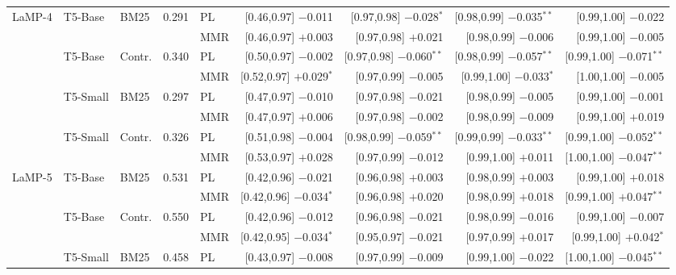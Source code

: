 \documentclass[10pt,twocolumn]{article}
\begin{document}
\begin{table}[t]
\begin{tabular}{@{}lllrlrrrr@{}}
\midrule
\multirow{2}{*}{LaMP-4} & \multirow{2}{*}{T5-Base} & \multirow{2}{*}{BM25} & \multirow{2}{*}{0.291} & PL & [0.46,0.97] $-$0.011 & [0.97,0.98] $-$0.028$^{*}$ & [0.98,0.99] $-$0.035$^{**}$ & [0.99,1.00] $-$0.022 \\
 & & & & MMR & [0.46,0.97] $+$0.003 & [0.97,0.98] $+$0.021 & [0.98,0.99] $-$0.006 & [0.99,1.00] $-$0.005 \\
\cmidrule(lr){1-9}
 & \multirow{2}{*}{T5-Base} & \multirow{2}{*}{Contr.} & \multirow{2}{*}{0.340} & PL & [0.50,0.97] $-$0.002 & [0.97,0.98] $-$0.060$^{**}$ & [0.98,0.99] $-$0.057$^{**}$ & [0.99,1.00] $-$0.071$^{**}$ \\
 & & & & MMR & [0.52,0.97] $+$0.029$^{*}$ & [0.97,0.99] $-$0.005 & [0.99,1.00] $-$0.033$^{*}$ & [1.00,1.00] $-$0.005 \\
\cmidrule(lr){1-9}
 & \multirow{2}{*}{T5-Small} & \multirow{2}{*}{BM25} & \multirow{2}{*}{0.297} & PL & [0.47,0.97] $-$0.010 & [0.97,0.98] $-$0.021 & [0.98,0.99] $-$0.005 & [0.99,1.00] $-$0.001 \\
 & & & & MMR & [0.47,0.97] $+$0.006 & [0.97,0.98] $-$0.002 & [0.98,0.99] $-$0.009 & [0.99,1.00] $+$0.019 \\
\cmidrule(lr){1-9}
 & \multirow{2}{*}{T5-Small} & \multirow{2}{*}{Contr.} & \multirow{2}{*}{0.326} & PL & [0.51,0.98] $-$0.004 & [0.98,0.99] $-$0.059$^{**}$ & [0.99,0.99] $-$0.033$^{**}$ & [0.99,1.00] $-$0.052$^{**}$ \\
 & & & & MMR & [0.53,0.97] $+$0.028 & [0.97,0.99] $-$0.012 & [0.99,1.00] $+$0.011 & [1.00,1.00] $-$0.047$^{**}$ \\
\midrule
\multirow{2}{*}{LaMP-5} & \multirow{2}{*}{T5-Base} & \multirow{2}{*}{BM25} & \multirow{2}{*}{0.531} & PL & [0.42,0.96] $-$0.021 & [0.96,0.98] $+$0.003 & [0.98,0.99] $+$0.003 & [0.99,1.00] $+$0.018 \\
 & & & & MMR & [0.42,0.96] $-$0.034$^{*}$ & [0.96,0.98] $+$0.020 & [0.98,0.99] $+$0.018 & [0.99,1.00] $+$0.047$^{**}$ \\
\cmidrule(lr){1-9}
 & \multirow{2}{*}{T5-Base} & \multirow{2}{*}{Contr.} & \multirow{2}{*}{0.550} & PL & [0.42,0.96] $-$0.012 & [0.96,0.98] $-$0.021 & [0.98,0.99] $-$0.016 & [0.99,1.00] $-$0.007 \\
 & & & & MMR & [0.42,0.95] $-$0.034$^{*}$ & [0.95,0.97] $-$0.021 & [0.97,0.99] $+$0.017 & [0.99,1.00] $+$0.042$^{*}$ \\
\cmidrule(lr){1-9}
 & \multirow{2}{*}{T5-Small} & \multirow{2}{*}{BM25} & \multirow{2}{*}{0.458} & PL & [0.43,0.97] $-$0.008 & [0.97,0.99] $-$0.009 & [0.99,1.00] $-$0.022 & [1.00,1.00] $-$0.045$^{**}$ \\

\end{tabular}
\end{table}
\end{document}
